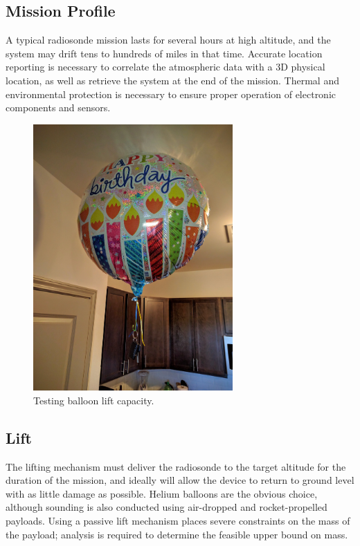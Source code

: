 \documentclass[conference,compsoc]{IEEEtran}
\begin{document}
\subsection{Mission Profile}
A typical radiosonde mission lasts for several hours at high altitude, and the system may drift tens to hundreds of miles in that time.  Accurate location reporting is necessary to correlate the atmospheric data with a 3D physical location, as well as retrieve the system at the end of the mission.  Thermal and environmental protection is necessary to ensure proper operation of electronic components and sensors.  

\begin{figure}[!t]
\centering
\includegraphics[width=3in]{balloon_keys.jpg}
\caption{Testing balloon lift capacity.}
\label{fig_sim}
\end{figure}

\subsection{Lift}
The lifting mechanism must deliver the radiosonde to the target altitude for the duration of the mission, and ideally will allow the device to return to ground level with as little damage as possible.  Helium balloons are the obvious choice, although sounding is also conducted using air-dropped and rocket-propelled payloads.  Using a passive lift mechanism places severe constraints on the mass of the payload; analysis is required to determine the feasible upper bound on mass.
\end{document}
